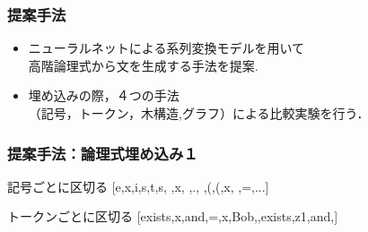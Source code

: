 \documentclass[dvipdfmx,cjk]{beamer}
\begin{document}
\begin{frame}
\frametitle{提案手法}
\begin{center}
\end{center}
\begin{block}{}
  \begin{itemize}
    \item ニューラルネットによる系列変換モデルを用いて\\高階論理式から文を生成する手法を提案.
    \item 埋め込みの際，４つの手法\\{\color{berry}（記号，トークン，木構造,グラフ）}による比較実験を行う．
  \end{itemize}
\end{block}

\end{frame}


\begin{frame}
\frametitle{提案手法：論理式埋め込み１}
\begin{block}{記号ごとに区切る}
  [e,x,i,s,t,s, ,x, ,., ,(,(,x, ,=,...]
\end{block}
\begin{block}{トークンごとに区切る}
  [exists,x,and,=,x,Bob,,exists,z1,and,]
\end{block}
\end{frame}
\end{document}
